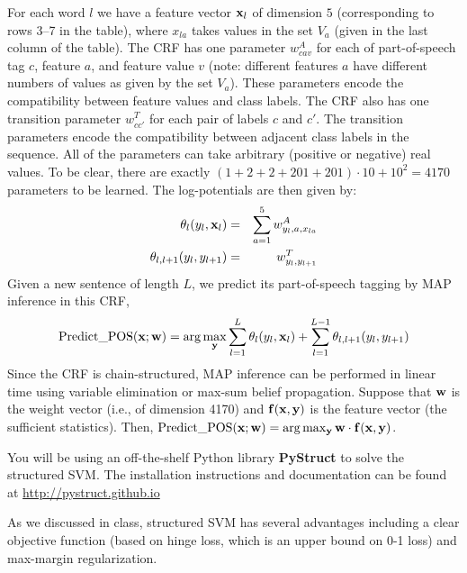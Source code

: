 \documentclass{article}
\newcommand{\ww}{{\bf w}}
\newcommand{\xx}{{\bf x}}
\newcommand{\yy}{{\bf y}}
\newcommand{\mbf}[1]{{\bf #1}}
\begin{document}
For each word $l$ we have a feature vector $\mbf{x}_l$ of dimension $5$ (corresponding to rows 3--7 in the table), where $x_{la}$ takes values in the set $V_a$ (given in the last column of the table). 
The CRF has one parameter $w^A_{cav}$ for each of part-of-speech tag $c$, feature $a$, and feature value $v$ (note: different features $a$ have different numbers of values as given by the set $V_a$). These parameters encode the compatibility between feature values and class labels. The CRF also has one transition parameter $w^T_{cc'}$ for each pair of labels $c$ and $c'$. The transition parameters encode the compatibility between adjacent class labels in the sequence. All of the parameters can take arbitrary (positive or negative) real values. To be clear, there are exactly $(1+2+2+201+201)\cdot 10 + 10^2 = 4170$ parameters to be learned. The log-potentials are then given by:
\begin{eqnarray*}
\theta_l(y_l, \mbf{x}_l)&=& \sum_{a=1}^5 w^A_{y_l, a, x_{la}}\\
\theta_{l,l+1}(y_l, y_{l+1})&=& w^T_{y_l, y_{l+1}}
\end{eqnarray*}
Given a new sentence of length $L$, we predict its part-of-speech tagging by MAP inference in this CRF,
\[
\textrm{Predict\_POS}(\mbf{x}; \ww) = \arg\max_{{\bf y}} \sum_{l=1}^L \theta_l(y_l, {\bf x}_l) + \sum_{l=1}^{L-1}\theta_{l, l+1}(y_l, y_{l+1})
\]
Since the CRF is chain-structured, MAP inference can be performed in linear time using variable elimination or max-sum belief propagation. Suppose that ${\bf w}$ is the weight vector (i.e., of dimension 4170) and ${\bf f}(\xx, \yy)$ is the feature vector (the sufficient statistics). Then, $\textrm{Predict\_POS}(\mbf{x}; \ww) = \arg\max_{{\bf y}} \ww \cdot {\bf f}(\xx, \yy)$.

You will be using an off-the-shelf Python library {\bf PyStruct} to solve the structured SVM. The installation instructions and documentation can be found at \url{http://pystruct.github.io}

As we discussed in class, structured SVM has several advantages including a clear objective function (based on hinge loss, which is an upper bound on 0-1 loss) and max-margin regularization. 
\end{document}
